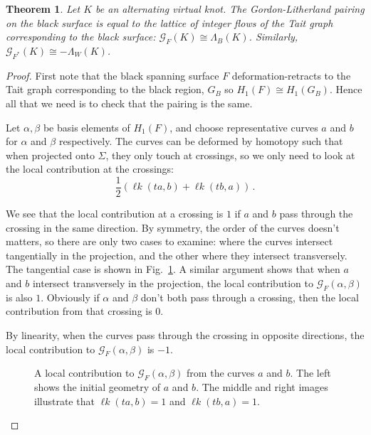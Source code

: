 \documentclass[12pt]{report}
\newcommand{\lk}{\operatorname{\ell\textit{k}}}
\newtheorem*{theorem}{Theorem}
\theoremstyle{upright}
\begin{document}
\begin{theorem}
Let $K$ be an alternating virtual knot. The Gordon-Litherland pairing on the black surface  is equal to the lattice of integer flows of the Tait graph corresponding to the black surface: $\mathcal{G}_{F}(K) \cong \Lambda_{B}(K)$. Similarly, $\mathcal{G}_{F^{*}}(K) \cong -\Lambda_{W}(K)$.
\end{theorem}

\begin{proof}
First note that the black spanning surface $F$ deformation-retracts to the Tait graph corresponding to the black region, $G_{B}$ so $H_{1}(F) \cong H_{1}(G_{B})$. Hence all that we need is to check that the pairing is the same.

Let $\alpha, \beta$ be basis elements of $H_{1}(F)$, and choose representative curves $a$ and $b$ for $\alpha$ and $\beta$ respectively. The curves can be deformed by homotopy such that when projected onto $\Sigma$, they only touch at crossings, so we only need to look at the local contribution at the crossings:
\[\dfrac{1}{2} \left( \lk(t a, b) + \lk(t b, a) \right)\,.\]

We see that the local contribution at a crossing is $1$ if $a$ and $b$ pass through the crossing in the same direction. By symmetry, the order of the curves doesn't matters, so there are only two cases to examine: where the curves intersect tangentially in the projection, and the other where they intersect transversely. The tangential case is shown in Fig.~\ref{fig:gordon-litherland-pairing-example}. A similar argument shows that when $a$ and $b$ intersect transversely in the projection, the local contribution to $\mathcal{G}_{F}(\alpha, \beta)$ is also $1$. Obviously if $\alpha$ and $\beta$ don't both pass through a crossing, then the local contribution from that crossing is 0.

By linearity, when the curves pass through the crossing in opposite directions, the local contribution to $\mathcal{G}_{F}(\alpha, \beta)$ is $-1$.

\begin{figure}[h!]
	\centering
	\def\svgscale{0.54}
	
	
	\caption{A local contribution to $\mathcal{G}_{F}(\alpha, \beta)$ from the curves $a$ and $b$. The left shows the initial geometry of $a$ and $b$. The middle and right images illustrate that $\lk(ta, b) = 1$ and $\lk(tb, a) = 1$.}
	\label{fig:gordon-litherland-pairing-example}
\end{figure}


\end{proof}
\end{document}
